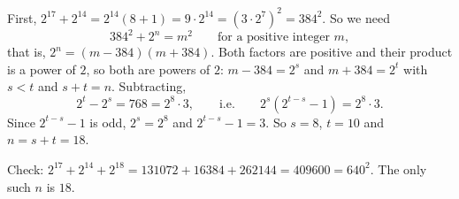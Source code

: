First, $2^{17}+2^{14}=2^{14}(8+1)=9\cdot2^{14}=\left(3\cdot2^7\right)^2=384^2$. So we need
\[
384^2+2^n=m^2\qquad\text{for a positive integer }m ,
\]
that is, $2^n=(m-384)(m+384)$. Both factors are positive and their product is a power of $2$, so both are powers of $2$: $m-384=2^s$ and $m+384=2^t$ with $s<t$ and $s+t=n$. Subtracting,
\[
2^t-2^s=768=2^8\cdot3,\qquad\text{i.e.}\qquad 2^s\left(2^{t-s}-1\right)=2^8\cdot3 .
\]
Since $2^{t-s}-1$ is odd, $2^s=2^8$ and $2^{t-s}-1=3$. So $s=8$, $t=10$ and $n=s+t=18$.

Check: $2^{17}+2^{14}+2^{18}=131072+16384+262144=409600=640^2$. The only such $n$ is $\boxed{18}$.

